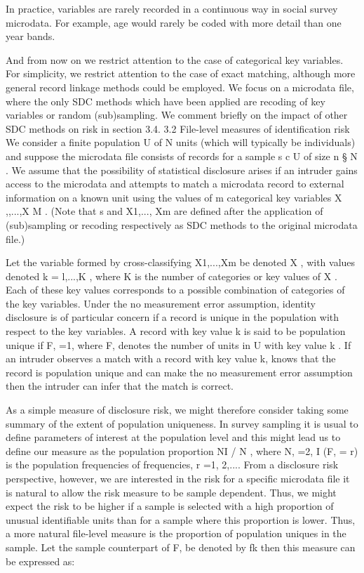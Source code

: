 In practice, variables are rarely recorded in a continuous way in social survey
microdata. For example, age would rarely be coded with more detail than one year bands.


And from now on we restrict attention to the case of categorical key variables. For
simplicity, we restrict attention to the case of exact matching, although more general
record linkage methods could be employed. We focus on a microdata file, where the only
SDC methods which have been applied are recoding of key variables or random
(sub)sampling. We comment briefly on the impact of other SDC methods on risk in
section 3.4.
3.2 File-level measures of identification risk
We consider a finite population U of N units (which will typically be individuals)
and suppose the microdata ﬁle consists of records for a sample s c U of size n § N . We
assume that the possibility of statistical disclosure arises if an intruder gains access to the
microdata and attempts to match a microdata record to external information on a known
unit using the values of m categorical key variables X ,,...,X M . (Note that s and
X1,..., Xm are defined after the application of (sub)sampling or recoding respectively as
SDC methods to the original microdata file.)

Let the variable formed by cross-classifying X1,...,Xm be denoted X , with values
denoted k = l,...,K , where K is the number of categories or key values of X . Each of
these key values corresponds to a possible combination of categories of the key variables.
Under the no measurement error assumption, identity disclosure is of particular concern
if a record is unique in the population with respect to the key variables. A record with key
value k is said to be population unique if F, =1, where F, denotes the number of units
in U with key value k . If an intruder observes a match with a record with key value k,
knows that the record is population unique and can make the no measurement error
assumption then the intruder can infer that the match is correct.

As a simple measure of disclosure risk, we might therefore consider taking some
summary of the extent of population uniqueness. In survey sampling it is usual to define
parameters of interest at the population level and this might lead us to define our measure
as the population proportion NI / N , where N, =2, I (F, = r) is the population
frequencies of frequencies, r =1, 2,.... From a disclosure risk perspective, however, we
are interested in the risk for a specific microdata ﬁle it is natural to allow the risk measure
to be sample dependent. Thus, we might expect the risk to be higher if a sample is
selected with a high proportion of unusual identifiable units than for a sample where this
proportion is lower. Thus, a more natural file-level measure is the proportion of
population uniques in the sample. Let the sample counterpart of F, be denoted by fk
then this measure can be expressed as:

